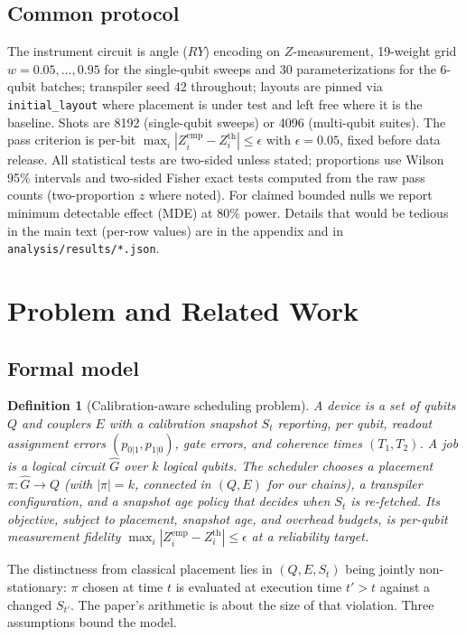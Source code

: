 \documentclass[journal,10pt,twocolumn]{IEEEtran}
\newtheorem{definition}{Definition}
\begin{document}
\subsection{Common protocol}
The instrument circuit is angle ($RY$) encoding on $Z$-measurement, 19-weight grid $w{=}0.05,\dots,0.95$ for the
single-qubit sweeps and 30 parameterizations for the 6-qubit batches; transpiler seed 42 throughout; layouts are
pinned via \texttt{initial\_layout} where placement is under test and left free where it is the baseline. Shots are
8192 (single-qubit sweeps) or 4096 (multi-qubit suites). The pass criterion is per-bit
$\max_i|Z_i^{\mathrm{emp}}-Z_i^{\mathrm{th}}|\le\epsilon$ with $\epsilon{=}0.05$, fixed before data release. All
statistical tests are two-sided unless stated; proportions use Wilson 95\% intervals and two-sided Fisher exact
tests computed from the raw pass counts (two-proportion $z$ where noted). For claimed bounded nulls we report
minimum detectable effect (MDE) at $80\%$ power. Details that would be tedious in the main text (per-row values)
are in the appendix and in \texttt{analysis/results/*.json}.

\section{Problem and Related Work}
\label{sec:related}
\subsection{Formal model}
\begin{definition}[Calibration-aware scheduling problem]
A device is a set of qubits $Q$ and couplers $E$ with a calibration snapshot $S_t$ reporting, per qubit, readout
assignment errors $(p_{0|1},p_{1|0})$, gate errors, and coherence times $(T_1,T_2)$. A job is a logical circuit
$\hat{G}$ over $k$ logical qubits. The scheduler chooses a \emph{placement} $\pi:\hat{G}\to Q$ (with
$|\pi|=k$, connected in $(Q,E)$ for our chains), a transpiler configuration, and a \emph{snapshot age policy}
that decides when $S_t$ is re-fetched. Its objective, subject to placement, snapshot age, and overhead budgets, is
per-qubit measurement fidelity $\max_i|Z_i^{\mathrm{emp}}\!\!-\!Z_i^{\mathrm{th}}|\!\le\!\epsilon$ at a
reliability target.
\end{definition}
The distinctness from classical placement lies in $(Q,E,S_t)$ being jointly non-stationary: $\pi$ chosen at time $t$
is evaluated at execution time $t'>t$ against a changed $S_{t'}$. The paper's arithmetic is about the size of that
violation. Three assumptions bound the model.
\end{document}
